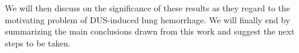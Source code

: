 We will then discuss on the significance of these results as
they regard to the motivating problem of \ac{DUS}-induced lung
hemorrhage. We will finally end by summarizing the main conclusions
drawn from this work and suggest the next steps to be taken.



%
